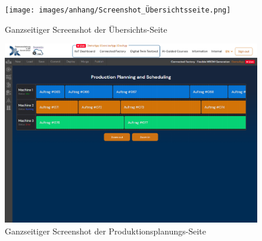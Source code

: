 %
\begin{figure}[htbp]
	\centering\texttt{[image: images/anhang/Screenshot\_Übersichtsseite.png]}
    \caption{Ganzseitiger Screenshot der Übersichts-Seite}
    \label{fig:anhang_Screenshot_Übersichtsseite}
\end{figure}
%
\begin{figure}[htbp]
	\centering\includegraphics[width=1.0\textwidth]{images/anhang/Screenshot_Produktionsplanung.png}
    \caption{Ganzseitiger Screenshot der Produktionsplanungs-Seite}
    \label{fig:anhang_Screenshot_Produktionsplanung}
\end{figure}
